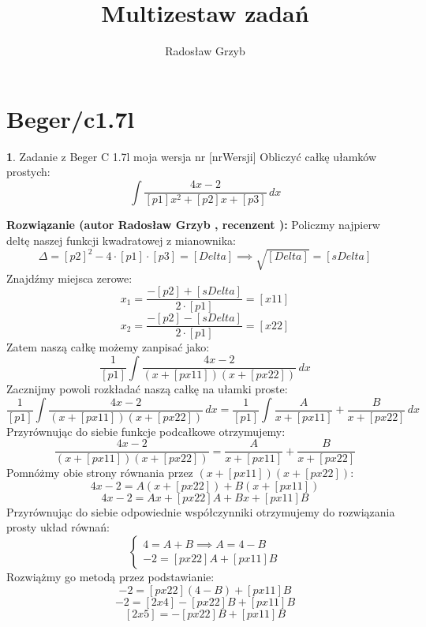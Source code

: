 \documentclass[12pt, a4paper]{article}
\title{Multizestaw zadań}
\author{Radosław Grzyb}
\date{}
\theoremstyle{definition} %
\newtheorem{zad}{}
\newcommand{\kategoria}[1]{\section{#1}} %
\newcommand{\zadStart}[1]{\begin{zad}#1\newline} %
\newcommand{\zadStop}{\end{zad}}   %
\newcommand{\rozwStart}[2]{\noindent \textbf{Rozwiązanie (autor #1 , recenzent #2): }\newline} %
\begin{document}
\maketitle
\kategoria{Beger/c1.7l}
\zadStart{Zadanie z Beger C 1.7l moja wersja nr [nrWersji]}
Obliczyć całkę ułamków prostych:
$$\int \frac{4x-2}{[p1]x^2+[p2]x+[p3]} \,dx$$
\zadStop
\rozwStart{Radosław Grzyb}{}
Policzmy najpierw deltę naszej funkcji kwadratowej z mianownika:
$$\Delta=[p2]^2-4\cdot[p1]\cdot[p3]=[Delta]\implies\sqrt{[Delta]}=[sDelta]$$
Znajdźmy miejsca zerowe:
$$x_{1}=\frac{-[p2]+[sDelta]}{2\cdot[p1]}=[x11]$$
$$x_{2}=\frac{-[p2]-[sDelta]}{2\cdot[p1]}=[x22]$$
Zatem naszą całkę możemy zanpisać jako:
$$\frac{1}{[p1]}\int \frac{4x-2}{(x+[px11])(x+[px22])} \,dx$$
Zacznijmy powoli rozkładać naszą całkę na ułamki proste:
$$\frac{1}{[p1]}\int \frac{4x-2}{(x+[px11])(x+[px22])} \,dx=\frac{1}{[p1]}\int \frac{A}{x+[px11]}+\frac{B}{x+[px22]} \,dx$$
Przyrównując do siebie funkcje podcałkowe otrzymujemy:
$$\frac{4x-2}{(x+[px11])(x+[px22])}=\frac{A}{x+[px11]}+\frac{B}{x+[px22]}$$
Pomnóżmy obie strony równania przez $(x+[px11])(x+[px22])$:
$$4x-2=A(x+[px22])+B(x+[px11])$$
$$4x-2=Ax+[px22]A+Bx+[px11]B$$
Przyrównując do siebie odpowiednie współczynniki otrzymujemy do rozwiązania prosty układ równań:
$$\begin{cases} 4=A+B \implies A=4-B  \\ -2=[px22]A+[px11]B \end{cases}$$
Rozwiążmy go metodą przez podstawianie:
$$-2=[px22](4-B)+[px11]B$$
$$-2=[2x4]-[px22]B+[px11]B$$
$$[2x5]=-[px22]B+[px11]B$$
\end{document}
